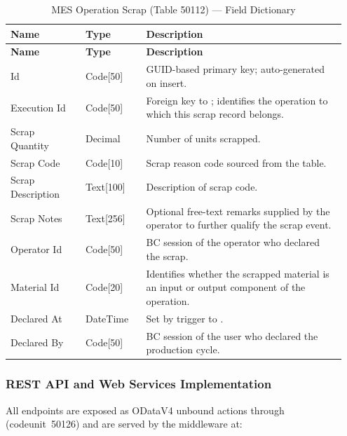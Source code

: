 \begin{longtable}{@{} P{0.21\linewidth} P{0.17\linewidth} P{0.57\linewidth} @{}}
    \caption{MES Operation Scrap (Table 50112) --- Field Dictionary}
    \label{tab:s3-table-scrap} \\
    \toprule
    \textbf{Name} & \textbf{Type} & \textbf{Description} \\
    \midrule
    \endfirsthead
    \toprule
    \textbf{Name} & \textbf{Type} & \textbf{Description} \\
    \midrule
    \endhead
   
    \endlastfoot

    Id & Code[50] & GUID-based primary key; auto-generated on insert. \\
    \midrule
    Execution Id & Code[50] & Foreign key to ; identifies the operation to which this scrap record belongs. \\
    \midrule
    Scrap Quantity & Decimal & Number of units scrapped. \\
    \midrule
    Scrap Code & Code[10] & Scrap reason code sourced from the   table. \\
    \midrule
    Scrap Description & Text[100] & Description of scrap code. \\
    \midrule
    Scrap Notes & Text[256] & Optional free-text remarks supplied by the operator to further qualify the scrap event. \\
    \midrule
    Operator Id & Code[50] & BC session  of the operator who declared the scrap. \\
    \midrule
    Material Id & Code[20] & Identifies whether the scrapped material is an input or output component of the operation. \\
    \midrule
    Declared At & DateTime & Set by  trigger to . \\
    \midrule
    Declared By & Code[50] & BC session  of the user who declared the production cycle. \\
    \midrule
\end{longtable}

\subsubsection*{REST API and Web Services Implementation}

All endpoints are exposed as ODataV4 unbound actions through
 (codeunit~50126) and are served by the
middleware at:


